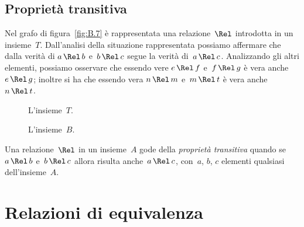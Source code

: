 \ovalbox{\risolvi \ref{ese:B.22}}

\subsection{Proprietà transitiva}

\begin{exrig}
 \begin{esempio}

Nel grafo di figura~\ref{fig:B.7} è rappresentata una relazione~$\Rel$ introdotta in un insieme~$T$. Dall'analisi della situazione rappresentata possiamo
affermare che dalla verità di $a \,\Rel\, b$ e~$b \,\Rel\, c$ segue la verità di~$a \,\Rel\, c$. Analizzando gli altri elementi, 
possiamo osservare che essendo vere $e \,\Rel\, f$ e~$f\, \Rel\, g$ è vera anche~$e \,\Rel\, g$;
inoltre si ha che essendo vera $n \,\Rel\, m$ e~$m \,\Rel\, t$ è vera anche~$n \,\Rel\, t$.
 \end{esempio}
\end{exrig}

\begin{figure}[ht]
\begin{minipage}[b]{.45\textwidth}
 \centering
 
 \caption{L'insieme~$T$.}\label{fig:B.7}
\end{minipage}\hfil
\begin{minipage}[b]{.45\textwidth}
 \centering
 
 \caption{L'insieme~$B$.}\label{fig:B.8}
\end{minipage}
\end{figure}

\begin{definizione}
Una relazione~$\Rel$ in un insieme~$A$ gode della \emph{proprietà transitiva} quando se~$a \,\Rel\, b$ e~$b \,\Rel\, c$
allora risulta anche~$a \,\Rel\, c$, con~$a$, $b$, $c$ elementi qualsiasi dell'insieme~$A$.
\end{definizione}

\ovalbox{\risolvii \ref{ese:B.23}, \ref{ese:B.24}, \ref{ese:B.25}, \ref{ese:B.26}, \ref{ese:B.27}, \ref{ese:B.28}, \ref{ese:B.29}}

\section{Relazioni di equivalenza}

